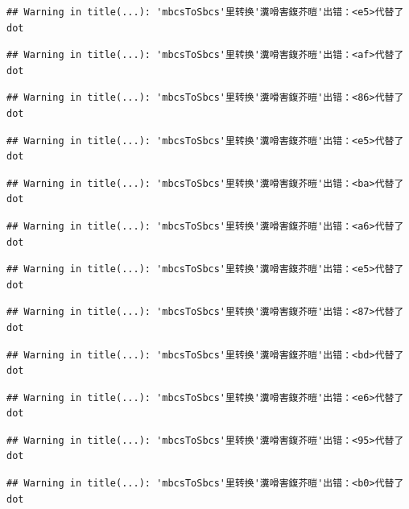 \documentclass[
]{book}
\begin{document}
\begin{verbatim}
## Warning in title(...): 'mbcsToSbcs'里转换'瀵嗗害鍑芥暟'出错：<e5>代替了dot
\end{verbatim}

\begin{verbatim}
## Warning in title(...): 'mbcsToSbcs'里转换'瀵嗗害鍑芥暟'出错：<af>代替了dot
\end{verbatim}

\begin{verbatim}
## Warning in title(...): 'mbcsToSbcs'里转换'瀵嗗害鍑芥暟'出错：<86>代替了dot
\end{verbatim}

\begin{verbatim}
## Warning in title(...): 'mbcsToSbcs'里转换'瀵嗗害鍑芥暟'出错：<e5>代替了dot
\end{verbatim}

\begin{verbatim}
## Warning in title(...): 'mbcsToSbcs'里转换'瀵嗗害鍑芥暟'出错：<ba>代替了dot
\end{verbatim}

\begin{verbatim}
## Warning in title(...): 'mbcsToSbcs'里转换'瀵嗗害鍑芥暟'出错：<a6>代替了dot
\end{verbatim}

\begin{verbatim}
## Warning in title(...): 'mbcsToSbcs'里转换'瀵嗗害鍑芥暟'出错：<e5>代替了dot
\end{verbatim}

\begin{verbatim}
## Warning in title(...): 'mbcsToSbcs'里转换'瀵嗗害鍑芥暟'出错：<87>代替了dot
\end{verbatim}

\begin{verbatim}
## Warning in title(...): 'mbcsToSbcs'里转换'瀵嗗害鍑芥暟'出错：<bd>代替了dot
\end{verbatim}

\begin{verbatim}
## Warning in title(...): 'mbcsToSbcs'里转换'瀵嗗害鍑芥暟'出错：<e6>代替了dot
\end{verbatim}

\begin{verbatim}
## Warning in title(...): 'mbcsToSbcs'里转换'瀵嗗害鍑芥暟'出错：<95>代替了dot
\end{verbatim}

\begin{verbatim}
## Warning in title(...): 'mbcsToSbcs'里转换'瀵嗗害鍑芥暟'出错：<b0>代替了dot
\end{verbatim}
\end{document}

